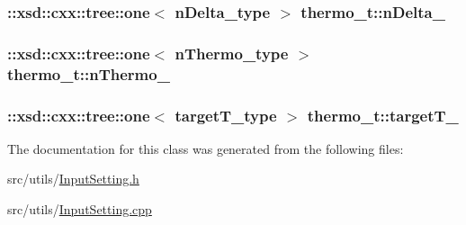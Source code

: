 \hypertarget{classthermo__t_a57e12294a2b9b189dfb9039c5d6ec8e5}{
\subsubsection[{n\-Delta\-\_\-}]{\setlength{\rightskip}{0pt plus 5cm}\-::xsd\-::cxx\-::tree\-::one$<$ {\bf n\-Delta\-\_\-type} $>$ thermo\-\_\-t\-::n\-Delta\-\_\-\hspace{0.3cm}{\ttfamily [protected]}}}\label{classthermo__t_a57e12294a2b9b189dfb9039c5d6ec8e5}
\hypertarget{classthermo__t_a547f76192ba098eb94349c88427b9839}{
\subsubsection[{n\-Thermo\-\_\-}]{\setlength{\rightskip}{0pt plus 5cm}\-::xsd\-::cxx\-::tree\-::one$<$ {\bf n\-Thermo\-\_\-type} $>$ thermo\-\_\-t\-::n\-Thermo\-\_\-\hspace{0.3cm}{\ttfamily [protected]}}}\label{classthermo__t_a547f76192ba098eb94349c88427b9839}
\hypertarget{classthermo__t_a1d1b8236fb2ea4426f2a83e04f8382d0}{
\subsubsection[{target\-T\-\_\-}]{\setlength{\rightskip}{0pt plus 5cm}\-::xsd\-::cxx\-::tree\-::one$<$ {\bf target\-T\-\_\-type} $>$ thermo\-\_\-t\-::target\-T\-\_\-\hspace{0.3cm}{\ttfamily [protected]}}}\label{classthermo__t_a1d1b8236fb2ea4426f2a83e04f8382d0}


The documentation for this class was generated from the following files\-:\begin{DoxyCompactItemize}
\item 
src/utils/\hyperlink{InputSetting_8h}{Input\-Setting.\-h}\item 
src/utils/\hyperlink{InputSetting_8cpp}{Input\-Setting.\-cpp}\end{DoxyCompactItemize}
